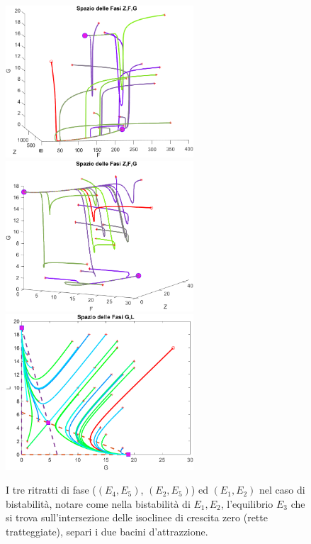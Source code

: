 \documentclass[12pt,a4paper]{article}
\numberwithin{theorem}{section}
\numberwithin{definition}{section}
\numberwithin{example}{section}
\begin{document}
\begin{figure}[h!]
    \centering
    \includegraphics[width=7cm]{grafici/bistab.png}
    \includegraphics[width=7cm]{grafici/bistab2.png}
    \\
    \includegraphics[width=7cm]{grafici/bistab3.png}
    \caption{I tre ritratti di fase ($(E_4,E_5)$, $(E_2,E_5)$) ed $(E_1,E_2)$ nel caso di bistabilità, notare come nella bistabilità di $E_1,E_2$, l'equilibrio $E_3$ che si trova sull'intersezione delle isoclinee di crescita zero (rette tratteggiate), separi i due bacini d'attrazzione.}
    \label{fig:E7}
\end{figure}

\newpage
\end{document}
